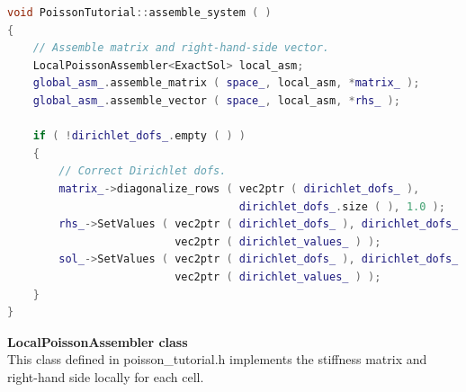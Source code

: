 \documentclass[a4paper, 11pt, twoside]{article}
\begin{document}
\begin{lstlisting}[language=C++, basicstyle={\footnotesize, \ttfamily}, keywordstyle=\color{blue}, numbers=none, tabsize=4]
void PoissonTutorial::assemble_system ( )
{
    // Assemble matrix and right-hand-side vector.
    LocalPoissonAssembler<ExactSol> local_asm;
    global_asm_.assemble_matrix ( space_, local_asm, *matrix_ );
    global_asm_.assemble_vector ( space_, local_asm, *rhs_ );

    if ( !dirichlet_dofs_.empty ( ) )
    {
        // Correct Dirichlet dofs.
        matrix_->diagonalize_rows ( vec2ptr ( dirichlet_dofs_ ), 
                                    dirichlet_dofs_.size ( ), 1.0 );
        rhs_->SetValues ( vec2ptr ( dirichlet_dofs_ ), dirichlet_dofs_.size ( ),
                          vec2ptr ( dirichlet_values_ ) );
        sol_->SetValues ( vec2ptr ( dirichlet_dofs_ ), dirichlet_dofs_.size ( ),
                          vec2ptr ( dirichlet_values_ ) );
    }
}
\end{lstlisting} 

\textbf{LocalPoissonAssembler class}\\
This class defined in poisson\_tutorial.h implements the stiffness matrix and right-hand side locally for each cell.
\end{document}
